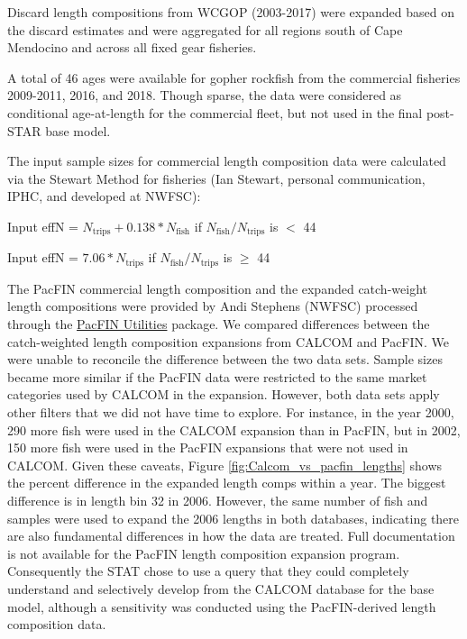\documentclass[12pt,]{article}
\begin{document}
Discard length compositions from WCGOP (2003-2017) were expanded based
on the discard estimates and were aggregated for all regions south of
Cape Mendocino and across all fixed gear fisheries.

A total of 46 ages were available for gopher rockfish from the
commercial fisheries 2009-2011, 2016, and 2018. Though sparse, the data
were considered as conditional age-at-length for the commercial fleet,
but not used in the final post-STAR base model.

The input sample sizes for commercial length composition data were
calculated via the Stewart Method for fisheries (Ian Stewart, personal
communication, IPHC, and developed at NWFSC):

\begin{center}

Input effN = $N_{\text{trips}} + 0.138 * N_{\text{fish}}$ if $N_{\text{fish}}/N_{\text{trips}}$ is $<$ 44

Input effN = $7.06 * N_{\text{trips}}$ if $N_{\text{fish}}/N_{\text{trips}}$ is $\geq$ 44

\end{center}

The PacFIN commercial length composition and the expanded catch-weight
length compositions were provided by Andi Stephens (NWFSC) processed
through the
\href{https://github.com/nwfsc-assess/PacFIN.Utilities}{PacFIN
Utilities} package. We compared differences between the catch-weighted
length composition expansions from CALCOM and PacFIN. We were unable to
reconcile the difference between the two data sets. Sample sizes became
more similar if the PacFIN data were restricted to the same market
categories used by CALCOM in the expansion. However, both data sets
apply other filters that we did not have time to explore. For instance,
in the year 2000, 290 more fish were used in the CALCOM expansion than
in PacFIN, but in 2002, 150 more fish were used in the PacFIN expansions
that were not used in CALCOM. Given these caveats, Figure
\ref{fig:Calcom_vs_pacfin_lengths} shows the percent difference in the
expanded length comps within a year. The biggest difference is in length
bin 32 in 2006. However, the same number of fish and samples were used
to expand the 2006 lengths in both databases, indicating there are also
fundamental differences in how the data are treated. Full documentation
is not available for the PacFIN length composition expansion program.
Consequently the STAT chose to use a query that they could completely
understand and selectively develop from the CALCOM database for the base
model, although a sensitivity was conducted using the PacFIN-derived
length composition data.
\end{document}
